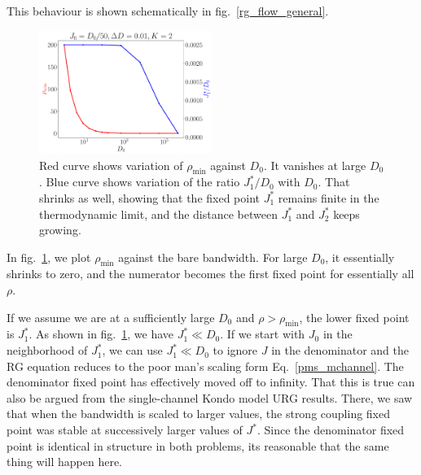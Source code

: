 \documentclass[12pt]{revtex4-2}
\begin{document}
This behaviour is shown schematically in fig.~\ref{rg_flow_general}. 
\begin{figure}[!htb]
	\centering
	\includegraphics[width=0.5\textwidth]{../numerics/rhomin_D.pdf}
	\caption{Red curve shows variation of \(\rho_\text{min}\) against \(D_0\). It vanishes at large \(D_0\). Blue curve shows variation of the ratio \(J_1^* / D_0\) with \(D_0\). That shrinks as well, showing that the fixed point \(J_1^*\) remains finite in the thermodynamic limit, and the distance between \(J_1^*\) and \(J_2^*\) keeps growing.}
	\label{rhomin_vs_D}
\end{figure}
In fig.~\ref{rhomin_vs_D}, we plot \(\rho_\text{min}\) against the bare bandwidth. For large \(D_0\), it essentially shrinks to zero, and the numerator becomes the first fixed point for essentially all \(\rho\).

If we assume we are at a sufficiently large \(D_0\) and \(\rho > \rho_\text{min}\), the lower fixed point is \(J_1^*\). As shown in fig.~\ref{rhomin_vs_D}, we have \(J_1^* \ll D_0\). If we start with \(J_0\) in the neighborhood of \(J_1^*\), we can use \(J_1^* \ll D_0\) to ignore \(J\) in the denominator and the RG equation reduces to the poor man's scaling form Eq.~\ref{pms_mchannel}. The denominator fixed point has effectively moved off to infinity. That this is true can also be argued from the single-channel Kondo model URG results. There, we saw that when the bandwidth is scaled to larger values, the strong coupling fixed point was stable at successively larger values of \(J^*\). Since the denominator fixed point is identical in structure in both problems, its reasonable that the same thing will happen here.
\end{document}
